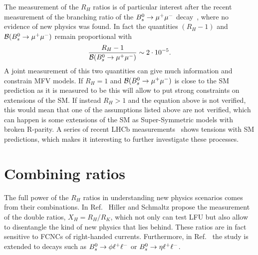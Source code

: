 The measurement of the $R_H$ ratios is of particular interest after the recent
measurement of the branching ratio of the ${{B}^0_{s}}\rightarrow{\ensuremath{\mu^+\mu^-}}$ decay~\cite{CMS:2014xfa}, 
where no evidence of new physics was found. In fact the quantities $(R_H - 1)$ and
${\cal B}({{B}^0_{s}} \rightarrow {\ensuremath{\mu^+\mu^-}})$ remain proportional with
%
\begin{equation}
\frac{R_H - 1}{{\cal B}({{B}^0_{s}} \rightarrow {\ensuremath{\mu^+\mu^-}})} \sim 2 \cdot 10^{-5}.
\end{equation}
%
A joint measurement of this two quantities can give much information and constrain MFV models.
If $R_H = 1$ and ${\cal B}({{B}^0_{s}} \rightarrow {\ensuremath{\mu^+\mu^-}})$ is close to the SM prediction as it is measured to be
this will allow to put strong constraints on extensions of the SM.
If instead $R_H > 1$ and the equation above is not verified, this would mean that one of the
assumptions listed above are not verified, which can happen is some extensions of the SM
as Super-Symmetric models with broken R-parity.
A series of recent LHCb measurements~\cite{TomRDreview} shows tensions with
SM predictions, which makes it interesting to further investigate these processes.

\section{Combining ratios}

The full power of the $R_H$ ratios in understanding new physics scenarios comes from
their combinations.  In Ref.~\cite{Hiller:2014ula} Hiller and Schmaltz propose the measurement 
of the double ratios, $X_H = R_H / R_K$, which not only can test LFU but also allow
to disentangle the kind of new physics that lies behind. These ratios are in fact sensitive
to FCNCs of right-handed currents. Furthermore, in Ref.~\cite{Hiller:2014ula} the study is extended
to \Bs decays such as ${{B}^0_{s}}\rightarrow\phi\ell^+ \ell^-$ or $\Bs\to\eta\ll$.

